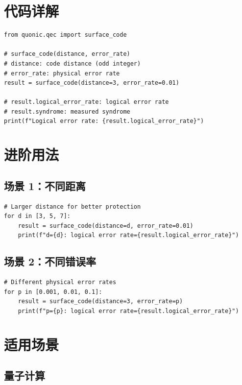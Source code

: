\documentclass[12pt,a4paper]{article}
\begin{document}
\section{代码详解}

\begin{lstlisting}[style=python]
from quonic.qec import surface_code

# surface_code(distance, error_rate)
# distance: code distance (odd integer)
# error_rate: physical error rate
result = surface_code(distance=3, error_rate=0.01)

# result.logical_error_rate: logical error rate
# result.syndrome: measured syndrome
print(f"Logical error rate: {result.logical_error_rate}")
\end{lstlisting}

\section{进阶用法}

\subsection{场景 1：不同距离}

\begin{lstlisting}[style=python]
# Larger distance for better protection
for d in [3, 5, 7]:
    result = surface_code(distance=d, error_rate=0.01)
    print(f"d={d}: logical error rate={result.logical_error_rate}")
\end{lstlisting}

\subsection{场景 2：不同错误率}

\begin{lstlisting}[style=python]
# Different physical error rates
for p in [0.001, 0.01, 0.1]:
    result = surface_code(distance=3, error_rate=p)
    print(f"p={p}: logical error rate={result.logical_error_rate}")
\end{lstlisting}

\section{适用场景}

\subsection{量子计算}
\end{document}
